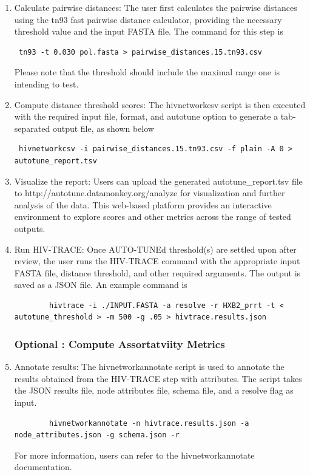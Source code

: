 \documentclass[utf8]{FrontiersinHarvard} %
\begin{document}
\begin{enumerate}

\item{ Calculate pairwise distances: The user first calculates the pairwise distances using the tn93 fast pairwise distance calculator, providing the necessary threshold value and the input FASTA file. The command for this step is 
\begin{verbatim}
 tn93 -t 0.030 pol.fasta > pairwise_distances.15.tn93.csv
\end{verbatim}

Please note that the threshold should include the maximal range one is intending to test.
}

\item {Compute distance threshold scores: The hivnetworkcsv script is then executed with the required input file, format, and autotune option to generate a tab-separated output file, as shown below
\begin{verbatim}
 hivnetworkcsv -i pairwise_distances.15.tn93.csv -f plain -A 0 > autotune_report.tsv
\end{verbatim}
}

\item {Visualize the report: Users can upload the generated autotune\_report.tsv file to http://autotune.datamonkey.org/analyze for visualization and further analysis of the data. This web-based platform provides an interactive environment to explore scores and other metrics across the range of tested outputs. }

\item {Run HIV-TRACE: Once AUTO-TUNEd threshold(s) are settled upon after review, the user runs the HIV-TRACE command with the appropriate input FASTA file, distance threshold, and other required arguments. The output is saved as a JSON file. An example command is
	\begin{verbatim}
 		hivtrace -i ./INPUT.FASTA -a resolve -r HXB2_prrt -t < autotune_threshold > -m 500 -g .05 > hivtrace.results.json
	\end{verbatim}
}

\subsubsection{Optional : Compute Assortatviity Metrics}

\item{ Annotate results: The hivnetworkannotate script is used to annotate the results obtained from the HIV-TRACE step with attributes. The script takes the JSON results file, node attributes file, schema file, and a resolve flag as input.
	\begin{verbatim}
 		hivnetworkannotate -n hivtrace.results.json -a node_attributes.json -g schema.json -r
	\end{verbatim}
 For more information, users can refer to the hivnetworkannotate documentation.
}


\end{enumerate}
\end{document}

